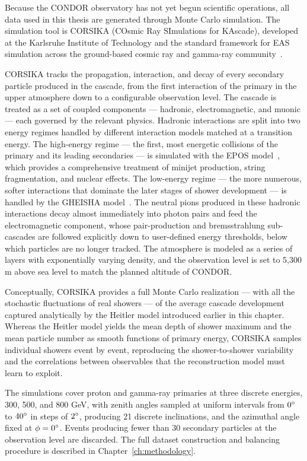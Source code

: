 Because the CONDOR observatory has not yet begun scientific operations, all data used in this thesis are generated through Monte Carlo simulation. The simulation tool is CORSIKA (COsmic Ray SImulations for KAscade), developed at the Karlsruhe Institute of Technology and the standard framework for EAS simulation across the ground-based cosmic ray and gamma-ray community~.

CORSIKA tracks the propagation, interaction, and decay of every secondary particle produced in the cascade, from the first interaction of the primary in the upper atmosphere down to a configurable observation level. The cascade is treated as a set of coupled components --- hadronic, electromagnetic, and muonic --- each governed by the relevant physics. Hadronic interactions are split into two energy regimes handled by different interaction models matched at a transition energy. The high-energy regime --- the first, most energetic collisions of the primary and its leading secondaries --- is simulated with the EPOS model~, which provides a comprehensive treatment of minijet production, string fragmentation, and nuclear effects. The low-energy regime --- the more numerous, softer interactions that dominate the later stages of shower development --- is handled by the GHEISHA model~. The neutral pions produced in these hadronic interactions decay almost immediately into photon pairs and feed the electromagnetic component, whose pair-production and bremsstrahlung sub-cascades are followed explicitly down to user-defined energy thresholds, below which particles are no longer tracked. The atmosphere is modeled as a series of layers with exponentially varying density, and the observation level is set to 5,300 m above sea level to match the planned altitude of CONDOR.

Conceptually, CORSIKA provides a full Monte Carlo realization --- with all the stochastic fluctuations of real showers --- of the average cascade development captured analytically by the Heitler model introduced earlier in this chapter. Whereas the Heitler model yields the mean depth of shower maximum and the mean particle number as smooth functions of primary energy, CORSIKA samples individual showers event by event, reproducing the shower-to-shower variability and the correlations between observables that the reconstruction model must learn to exploit.

The simulations cover proton and gamma-ray primaries at three discrete energies, 300, 500, and 800 GeV, with zenith angles sampled at uniform intervals from $0\degree$ to $40\degree$ in steps of $2\degree$, producing 21 discrete inclinations, and the azimuthal angle fixed at $\phi = 0\degree$. Events producing fewer than 30 secondary particles at the observation level are discarded. The full dataset construction and balancing procedure is described in Chapter~\ref{ch:methodology}.

